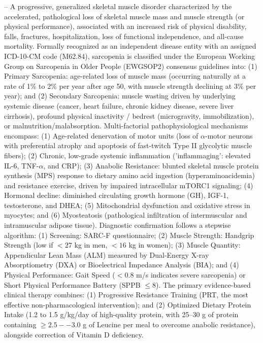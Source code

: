 -- A progressive, generalized skeletal muscle disorder characterized by the accelerated, pathological loss of skeletal muscle mass and muscle strength (or physical performance), associated with an increased risk of physical disability, falls, fractures, hospitalization, loss of functional independence, and all-cause mortality. Formally recognized as an independent disease entity with an assigned ICD-10-CM code (M62.84), sarcopenia is classified under the European Working Group on Sarcopenia in Older People (EWGSOP2) consensus guidelines into: (1) Primary Sarcopenia: age-related loss of muscle mass (occurring naturally at a rate of 1\% to 2\% per year after age 50, with muscle strength declining at 3\% per year); and (2) Secondary Sarcopenia: muscle wasting driven by underlying systemic disease (cancer, heart failure, chronic kidney disease, severe liver cirrhosis), profound physical inactivity / bedrest (microgravity, immobilization), or malnutrition/malabsorption. Multi-factorial pathophysiological mechanisms encompass: (1) Age-related denervation of motor units (loss of $\alpha$-motor neurons with preferential atrophy and apoptosis of fast-twitch Type II glycolytic muscle fibers); (2) Chronic, low-grade systemic inflammation ('inflammaging': elevated IL-6, TNF-$\alpha$, and CRP); (3) Anabolic Resistance: blunted skeletal muscle protein synthesis (MPS) response to dietary amino acid ingestion (hyperaminoacidemia) and resistance exercise, driven by impaired intracellular mTORC1 signaling; (4) Hormonal decline: diminished circulating growth hormone (GH), IGF-1, testosterone, and DHEA; (5) Mitochondrial dysfunction and oxidative stress in myocytes; and (6) Myosteatosis (pathological infiltration of intermuscular and intramuscular adipose tissue). Diagnostic confirmation follows a stepwise algorithm: (1) Screening: SARC-F questionnaire; (2) Muscle Strength: Handgrip Strength (low if $<27$ kg in men, $<16$ kg in women); (3) Muscle Quantity: Appendicular Lean Mass (ALM) measured by Dual-Energy X-ray Absorptiometry (DXA) or Bioelectrical Impedance Analysis (BIA); and (4) Physical Performance: Gait Speed ($<0.8$ m/s indicates severe sarcopenia) or Short Physical Performance Battery (SPPB $\le 8$). The primary evidence-based clinical therapy combines: (1) Progressive Resistance Training (PRT, the most effective non-pharmacological intervention); and (2) Optimized Dietary Protein Intake (1.2 to 1.5 g/kg/day of high-quality protein, with 25--30 g of protein containing $\ge 2.5--3.0$ g of Leucine per meal to overcome anabolic resistance), alongside correction of Vitamin D deficiency.

